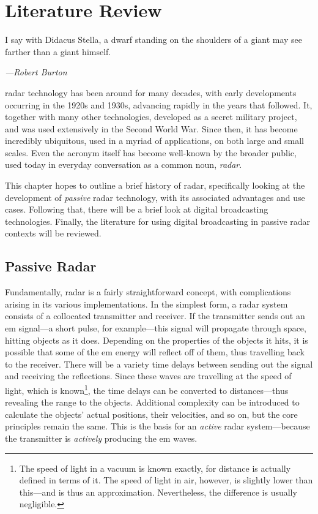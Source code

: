 \documentclass[class=report,11pt,crop=false]{standalone}
\begin{document}
\chapter{Literature Review}
\epigraph{I say with Didacus Stella, a dwarf standing on the shoulders of a giant may see farther than a giant himself.}%
    {\emph{---Robert Burton}}

 \gls{radar} technology has been around for many decades, with early developments occurring in the 1920s and 1930s, advancing rapidly in the years that followed. It, together with many other technologies, developed as a secret military project, and was used extensively in the Second World War. Since then, it has become incredibly ubiquitous, used in a myriad of applications, on both large and small scales. Even the acronym itself has become well-known by the broader public, used today in everyday conversation as a common noun, \emph{radar}.

This chapter hopes to outline a brief history of radar, specifically looking at the development of \emph{passive} radar technology, with its associated advantages and use cases. Following that, there will be a brief look at digital broadcasting technologies. Finally, the literature for using digital broadcasting in passive radar contexts will be reviewed.

\section{Passive Radar}

Fundamentally, radar is a fairly straightforward concept, with complications arising in its various implementations. In the simplest form, a radar system consists of a collocated transmitter and receiver. If the transmitter sends out an \gls{em} signal---a short pulse, for example---this signal will propagate through space, hitting objects as it does. Depending on the properties of the objects it hits, it is possible that some of the \gls{em} energy will reflect off of them, thus travelling back to the receiver. There will be a variety time delays between sending out the signal and receiving the reflections. Since these waves are travelling at the speed of light, which is known\footnote{The speed of light in a vacuum is known exactly, for distance is actually defined in terms of it. The speed of light in air, however, is slightly lower than this---and is thus an approximation. Nevertheless, the difference is usually negligible.}, the time delays can be converted to distances---thus revealing the range to the objects. Additional complexity can be introduced to calculate the objects' actual positions, their velocities, and so on, but the core principles remain the same. This is the basis for an \emph{active} radar system---because the transmitter is \emph{actively} producing the \gls{em} waves.
\end{document}
